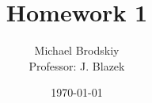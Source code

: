 


\title{Homework 1}
\date{\today}
\author{Michael Brodskiy\\ \small Professor: J. Blazek}



\maketitle

